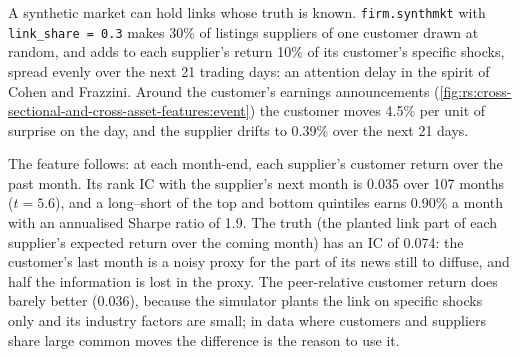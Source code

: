 A synthetic market can hold links whose truth is known. \texttt{firm.synthmkt} with \texttt{link\_share = 0.3} makes 30\% of
listings suppliers of one customer drawn at random, and adds to each supplier's return 10\% of its customer's specific shocks,
spread evenly over the next 21 trading days: an attention delay in the spirit of Cohen and Frazzini. Around the customer's earnings
announcements (\cref{fig:rs:cross-sectional-and-cross-asset-features:event}) the customer moves 4.5\% per unit of surprise on the
day, and the supplier drifts to 0.39\% over the next 21 days.

\begin{omfigure}

\label{fig:rs:cross-sectional-and-cross-asset-features:event}
\end{omfigure}

The feature follows: at each month-end, each supplier's customer return over the past month. Its rank IC with the supplier's next
month is 0.035 over 107 months ($t = 5.6$), and a long--short of the top and bottom quintiles earns 0.90\% a month with an
annualised Sharpe ratio of 1.9. The truth (the planted link part of each supplier's expected return over the coming month) has an
IC of 0.074: the customer's last month is a noisy proxy for the part of its news still to diffuse, and half the information is
lost in the proxy. The peer-relative customer return does barely better (0.036), because the simulator plants the link on specific
shocks only and its industry factors are small; in data where customers and suppliers share large common moves the difference is
the reason to use it.

